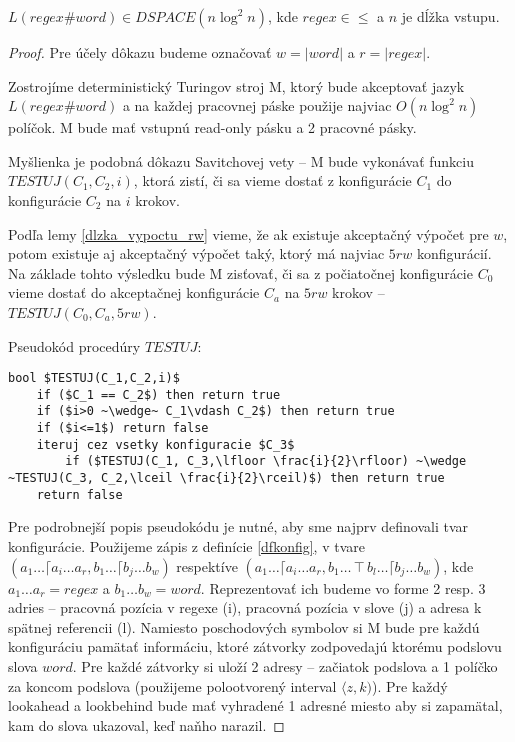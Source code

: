 \begin{veta}
$L(regex\#word) \in DSPACE(n \log^2 n)$, kde $regex \in \le$ a $n$ je dĺžka vstupu.
\end{veta}
\begin{proof}
Pre účely dôkazu budeme označovať $w = |word|$ a $r = |regex|$.

Zostrojíme deterministický Turingov stroj M, ktorý bude akceptovať jazyk $L(regex\#word)$ a na každej pracovnej páske použije najviac $O(n\log^2 n)$ políčok. M bude mať vstupnú read-only pásku a 2 pracovné pásky.

Myšlienka je podobná dôkazu Savitchovej vety -- M bude vykonávať funkciu $TESTUJ(C_1,C_2,i)$, ktorá zistí, či sa vieme dostať z konfigurácie $C_1$ do konfigurácie $C_2$ na $i$ krokov. 

Podľa lemy \ref{dlzka_vypoctu_rw} vieme, že ak existuje akceptačný výpočet pre $w$, potom existuje aj akceptačný výpočet taký, ktorý má najviac $5rw$ konfigurácií. Na základe tohto výsledku bude M zisťovať, či sa z počiatočnej konfigurácie $C_0$ vieme dostať do akceptačnej konfigurácie $C_a$ na $5rw$ krokov -- $TESTUJ(C_0,C_a,5rw)$.

Pseudokód procedúry $TESTUJ$:
\begin{lstlisting}[mathescape]
bool $TESTUJ(C_1,C_2,i)$
	if ($C_1 == C_2$) then return true
	if ($i>0 ~\wedge~ C_1\vdash C_2$) then return true
	if ($i<=1$) return false
	iteruj cez vsetky konfiguracie $C_3$
		if ($TESTUJ(C_1, C_3,\lfloor \frac{i}{2}\rfloor) ~\wedge ~TESTUJ(C_3, C_2,\lceil \frac{i}{2}\rceil)$) then return true
	return false
\end{lstlisting}

Pre podrobnejší popis pseudokódu je nutné, aby sme najprv definovali tvar konfigurácie. Použijeme zápis z definície \ref{dfkonfig}, v tvare $(a_1\dots \lceil a_i \dots a_r, b_1 \dots\lceil b_j \dots b_w)$ respektíve $(a_1\dots \lceil a_i \dots a_r, b_1 \ldots \intercal b_l \dots \lceil b_j \dots b_w)$, kde $a_1\dots a_r = regex$ a $b_1\dots b_w = word$. Reprezentovať ich budeme vo forme 2 resp. 3 adries -- pracovná pozícia v regexe (i), pracovná pozícia v slove (j) a adresa k spätnej referencii (l). Namiesto poschodových symbolov si M bude pre každú konfiguráciu pamätať informáciu, ktoré zátvorky zodpovedajú ktorému podslovu slova $word$. Pre každé zátvorky si uloží 2 adresy -- začiatok podslova a 1 políčko za koncom podslova (použijeme polootvorený interval $\langle z,k)$). Pre každý lookahead a lookbehind bude mať vyhradené 1 adresné miesto aby si zapamätal, kam do slova ukazoval, keď naňho narazil.


\end{proof}
